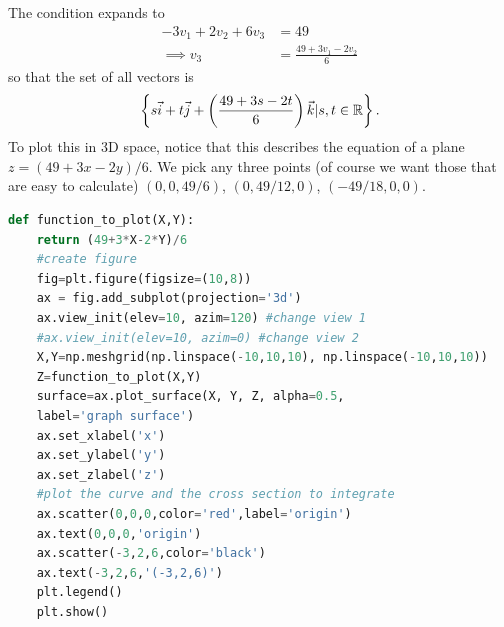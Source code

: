 \label{plane_projection}
The condition expands to \begin{align*}
	-3v_1+2v_2+6v_3 &= 49 \\
	\implies v_3 &= \frac{49+3v_1 - 2v_2}{6}  
\end{align*}
so that the set of all vectors is \[
	\left\{s \vec{i}+t \vec{j}+\left(\frac{49+3s - 2t}{6}\right) \vec{k} | s,t\in\mathbb{R}\right\}.
\]
To plot this in 3D space, notice that this describes the equation of a plane $z={(49+3x-2y)}/{6}$. We pick any three points (of course we want those that are easy to calculate) $(0,0,49/6)$, $(0,49/12,0)$, $(-49/18,0,0)$.

\begin{lstlisting}[language=Python]
	def function_to_plot(X,Y):
	return (49+3*X-2*Y)/6
	#create figure
	fig=plt.figure(figsize=(10,8))
	ax = fig.add_subplot(projection='3d')
	ax.view_init(elev=10, azim=120) #change view 1  
	#ax.view_init(elev=10, azim=0) #change view 2
	X,Y=np.meshgrid(np.linspace(-10,10,10), np.linspace(-10,10,10))
	Z=function_to_plot(X,Y)
	surface=ax.plot_surface(X, Y, Z, alpha=0.5,
	label='graph surface')
	ax.set_xlabel('x')
	ax.set_ylabel('y')
	ax.set_zlabel('z')
	#plot the curve and the cross section to integrate
	ax.scatter(0,0,0,color='red',label='origin')
	ax.text(0,0,0,'origin')
	ax.scatter(-3,2,6,color='black')
	ax.text(-3,2,6,'(-3,2,6)')
	plt.legend()
	plt.show()
\end{lstlisting}

